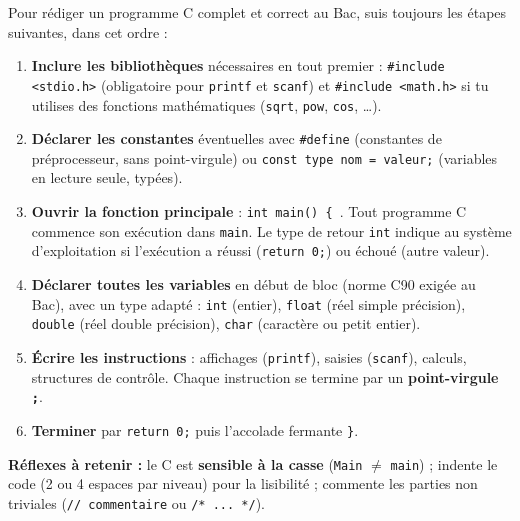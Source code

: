 \documentclass[11pt]{article}
\begin{document}
\begin{methode}
Pour rédiger un programme C complet et correct au Bac, suis toujours les étapes suivantes, dans cet ordre :
\begin{enumerate}
\item \textbf{Inclure les bibliothèques} nécessaires en tout premier : \texttt{\#include <stdio.h>} (obligatoire pour \texttt{printf} et \texttt{scanf}) et \texttt{\#include <math.h>} si tu utilises des fonctions mathématiques (\texttt{sqrt}, \texttt{pow}, \texttt{cos}, \ldots).
\item \textbf{Déclarer les constantes} éventuelles avec \texttt{\#define} (constantes de préprocesseur, sans point-virgule) ou \texttt{const type nom = valeur;} (variables en lecture seule, typées).
\item \textbf{Ouvrir la fonction principale} : \texttt{int main() \{ }. Tout programme C commence son exécution dans \texttt{main}. Le type de retour \texttt{int} indique au système d'exploitation si l'exécution a réussi (\texttt{return 0;}) ou échoué (autre valeur).
\item \textbf{Déclarer toutes les variables} en début de bloc (norme C90 exigée au Bac), avec un type adapté : \texttt{int} (entier), \texttt{float} (réel simple précision), \texttt{double} (réel double précision), \texttt{char} (caractère ou petit entier).
\item \textbf{Écrire les instructions} : affichages (\texttt{printf}), saisies (\texttt{scanf}), calculs, structures de contrôle. Chaque instruction se termine par un \textbf{point-virgule \texttt{;}}.
\item \textbf{Terminer} par \texttt{return 0;} puis l'accolade fermante \texttt{\}}.
\end{enumerate}
\textbf{Réflexes à retenir :} le C est \textbf{sensible à la casse} (\texttt{Main} $\neq$ \texttt{main}) ; indente le code (2 ou 4 espaces par niveau) pour la lisibilité ; commente les parties non triviales (\texttt{// commentaire} ou \texttt{/* ... */}).
\end{methode}
\end{document}
